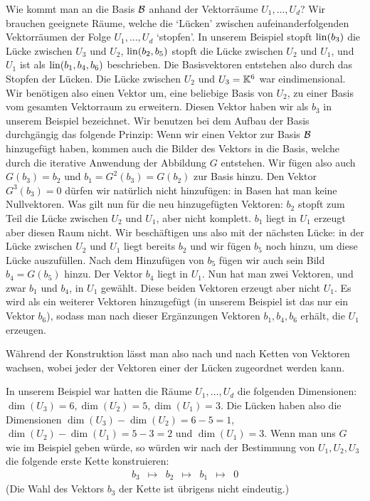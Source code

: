 \begin{bsp}
	Wie kommt man an die Basis $\mathcal{B}$ anhand der Vektorräume $U_1,\ldots,U_d$? Wir brauchen geeignete Räume, welche die `Lücken' zwischen aufeinanderfolgenden Vektorräumen der Folge $U_1,\ldots,U_d$ `stopfen'. 
	In unserem Beispiel stopft $\operatorname{lin}(b_3)$ die Lücke zwischen $U_3$ und $U_2$, $\operatorname{lin}(b_2,b_5)$ stopft die Lücke zwischen $U_2$ und $U_1$, und $U_1$ ist als $\operatorname{lin}(b_1,b_4,b_6)$ beschrieben. Die Basisvektoren entstehen also durch das Stopfen der Lücken. Die Lücke zwischen $U_2$ und $U_3= \mathbb K^6$ war eindimensional. Wir benötigen also einen Vektor um, eine beliebige Basis von $U_2$, zu einer Basis vom gesamten Vektorraum zu erweitern. Diesen Vektor haben wir als $b_3$ in unserem Beispiel bezeichnet. Wir benutzen bei dem Aufbau der Basis durchgängig das folgende Prinzip: Wenn wir einen Vektor zur Basis $\mathcal{B}$ hinzugefügt haben, kommen auch  die Bilder des Vektors in die Basis, welche durch die iterative Anwendung der Abbildung $G$ entstehen. Wir fügen also auch $G(b_3) = b_2$ und $b_1 = G^2(b_3) = G (b_2)$ zur Basis hinzu. Den Vektor $G^3(b_3) =0$ dürfen wir natürlich nicht hinzufügen: in Basen hat man keine Nullvektoren. Was gilt nun für die neu hinzugefügten Vektoren: $b_2$ stopft zum Teil die Lücke zwischen $U_2$ und $U_1$, aber nicht komplett. $b_1$ liegt in $U_1$ erzeugt aber diesen Raum nicht. Wir beschäftigen uns also mit der nächsten Lücke: in der Lücke zwischen $U_2$ und $U_1$ liegt bereits $b_2$ und wir fügen $b_5$ noch hinzu, um diese Lücke auszufüllen. Nach dem Hinzufügen von $b_5$ fügen wir auch sein Bild $b_4 = G(b_5)$ hinzu. Der Vektor $b_4$ liegt in $U_1$. Nun hat man zwei Vektoren, und zwar $b_1$ und $b_4$, in $U_1$ gewählt. Diese beiden Vektoren erzeugt aber nicht $U_1$. Es wird als ein weiterer Vektoren hinzugefügt (in unserem Beispiel ist das nur ein Vektor $b_6$),  sodass man nach dieser Ergänzungen Vektoren $b_1, b_4, b_6$ erhält, die $U_1$ erzeugen. 
	
	Während der Konstruktion lässt man also nach und  nach Ketten von Vektoren wachsen, wobei jeder der Vektoren einer der Lücken zugeordnet werden kann. 
	
	In unserem Beispiel war hatten die Räume $U_1,\ldots,U_d$ die folgenden Dimensionen: $\dim(U_3) = 6, \dim(U_2) = 5, \dim (U_1) = 3$. Die Lücken haben also die Dimensionen $\dim(U_3) -\dim(U_2) = 6-5=1$, $\dim(U_2) -\dim(U_1) =  5-3=2$ und $\dim(U_1) = 3$. Wenn man uns $G$ wie im Beispiel geben würde, so würden wir nach der Bestimmung von $U_1,U_2,U_3$ die folgende erste Kette konstruieren: 
	\begin{equation*}
		\begin{array}{ccccccc}
			b_3 & \mapsto & b_2 & \mapsto & b_1 & \mapsto & 0
		\end{array}
	\end{equation*}
	(Die Wahl des Vektors $b_3$ der Kette ist übrigens nicht eindeutig.)
	

\end{bsp}
